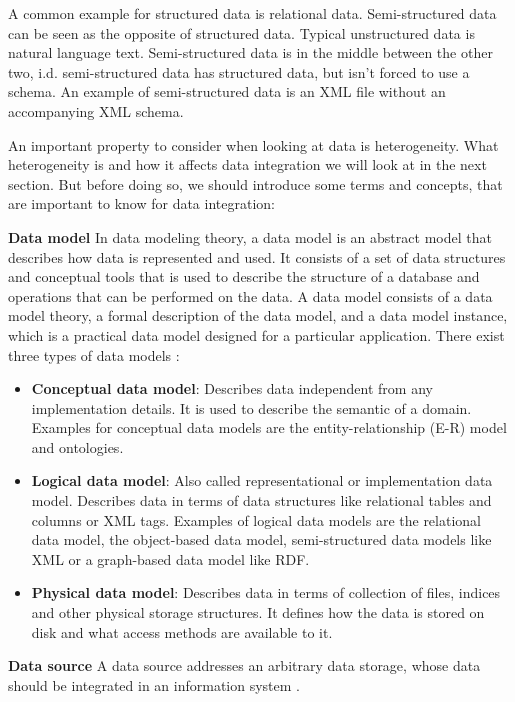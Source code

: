 A common example for structured data is relational data. Semi-structured data can be seen as the opposite of structured data. Typical unstructured data is natural language text. Semi-structured data is in the middle between the other two, i.d. semi-structured data has structured data, but isn't forced to use a schema. An example of semi-structured data is an XML file without an accompanying XML schema.

An important property to consider when looking at data is heterogeneity. What heterogeneity is and how it affects data integration we will look at in the next section. But before doing so, we should introduce some terms and concepts, that are important to know for data integration:

\textbf{Data model} \label{data_model_index} In data modeling theory, a data model is an abstract model that describes how data is represented and used. It consists of a set of data structures and conceptual tools that is used to describe the structure of a database and operations that can be performed on the data. A data model consists of a data model theory, a formal description of the data model, and a data model instance, which is a practical data model designed for a particular application. There exist three types of data models \cite[p.10-14]{IntroductionToDatabaseSystems2010}:
\begin{itemize}
	\item \textbf{Conceptual data model}: Describes data independent from any implementation details. It is used to describe the semantic of a domain. Examples for conceptual data models are the entity-relationship (E-R) model and ontologies. 
	\item \textbf{Logical data model}: Also called representational or implementation data model. Describes data in terms of data structures like relational tables and columns or XML tags. Examples of logical data models are the relational data model, the object-based data model, semi-structured data models like XML or a graph-based data model like RDF. 
	\item \textbf{Physical data model}: Describes data in terms of collection of files, indices and other physical storage structures. It defines how the data is stored on disk and what access methods are available to it. 
\end{itemize}

\textbf{Data source}\label{data_source_index} A data source addresses an arbitrary data storage, whose data should be integrated in an information system \cite[p. 7]{DBLP:books/dp/LeserN2006}.

